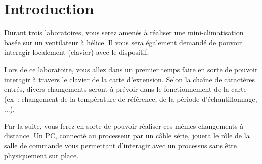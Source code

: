 \documentclass[11pt,a4paper]{article}
\theoremstyle{definition}%
\begin{document}


\section{Introduction}
Durant trois laboratoires, vous serez amenés à réaliser une mini-climatisation basée sur un ventilateur à hélice.
Il vous sera également demandé de pouvoir interagir localement (clavier) avec le dispositif.

Lors de ce laboratoire, vous allez dans un premier temps faire en sorte de pouvoir interagir à travers le clavier de la carte d’extension.
Selon la chaîne de caractères entrés, divers changements seront à prévoir dans le fonctionnement de la carte (ex~: changement de la température de référence, de la période d’échantillonnage, ...).

Par la suite, vous ferez en sorte de pouvoir réaliser ces mêmes changements à distance.
Un PC, connecté au processeur par un câble série, jouera le rôle de la salle de commande vous permettant d’interagir avec un processus sans être physiquement sur place.






\end{document}
